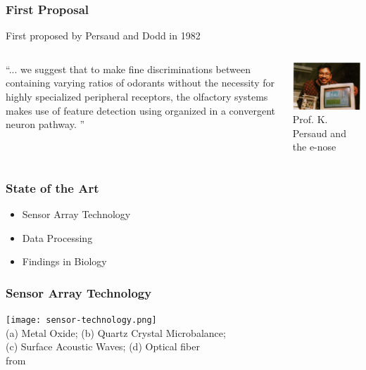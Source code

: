 \documentclass{beamer}
\newcommand{\mancite}[1]{{\scriptsize{\textbf{\color{MainGreen}{[#1] }}}}}
\renewcommand{\emph}[1]{{\color{MainBlue}{#1}}}
\begin{document}
\begin{frame}
\frametitle{First Proposal}
\noindent First proposed by Persaud and Dodd in 1982
\begin{columns}
\begin{block}{}
  ``... we suggest that to make fine
  discriminations between \emph{complex odorant mixtures} containing
  varying ratios of odorants without the necessity for highly
  specialized peripheral receptors, the olfactory systems makes
  use of feature detection using \emph{broadly tuned receptor cells}
  organized in a convergent neuron pathway. 
  ''
\end{block}
\begin{center}
\includegraphics{images/krishna.png} \\
{\tiny Prof. K. Persaud and the e-nose}
\end{center}
\end{columns}
\end{frame}

\begin{frame}
\frametitle{State of the Art}
\begin{itemize}
  \item Sensor Array Technology
  \item Data Processing
  \item Findings in Biology 
\end{itemize}
\end{frame}

\begin{frame}
\frametitle{Sensor Array Technology}
\begin{center}
\texttt{[image: sensor-technology.png]} \\
{\tiny 
(a) Metal Oxide; (b) Quartz Crystal Microbalance; \\
(c) Surface Acoustic Waves; (d) Optical fiber \\
from \mancite{Gutierrez-Osuna, 1998} 
}
\end{center}
\end{frame}
\end{document}
